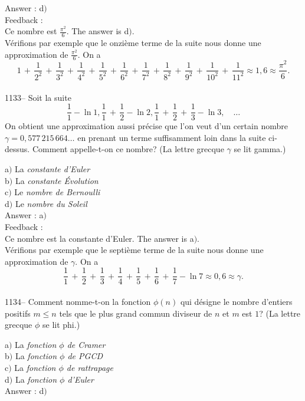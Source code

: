 ﻿\documentclass[letterpaper, 12pt]{article}
\begin{document}
Answer : d$)$\\

Feedback : \\
Ce nombre est $\frac{\pi^2}6$. The answer is d$)$.\\
V\'erifions
par exemple que le onzi\`eme terme de la suite nous donne une
approximation de $\frac{\pi^2}6$. On a
$$\displaystyle{1\,+\,\frac1{2^2}\,+\,\frac1{3^2}\,+\,\frac1{4^2}\,+\,\frac1{5^2}\,+\,\frac1{6^2}\,+\,\frac1{7^2}
\,+\,\frac1{8^2}\,+\,\frac1{9^2}\,+\,\frac1{10^2}\,+\,\frac1{11^2}\approx1,6\approx\frac{\pi^2}6}.$$\\

1133-- Soit la suite
$$\displaystyle{\frac11-\ln1,\frac11\,+\,\frac12-\ln2,\frac11\,+\,\frac12\,+\,\frac13-\ln3},\quad\ldots$$
On obtient une approximation aussi pr\'ecise que l'on veut d'un
certain nombre $\gamma=0,577\,215\,664\ldots$ en prenant un terme
suffisamment loin dans la suite ci-dessus. Comment appelle-t-on ce
nombre? (La lettre grecque $\gamma$ se lit gamma.)

a$)$ La {\sl constante d'Euler}\\
b$)$ La {\sl constante \'Evolution} \\
c$)$ Le {\sl nombre de Bernoulli} \\
d$)$ Le {\sl nombre du Soleil}\\

Answer : a$)$\\

Feedback : \\
Ce nombre est la constante d'Euler. The answer is
a$)$.\\
V\'erifions par exemple que le septi\`eme terme de la suite
nous donne une approximation de $\gamma$. On a
$$\displaystyle{\frac11\,+\,\frac12\,+\,\frac13\,+\,\frac14\,+\,\frac15\,+\,\frac16\,+\,\frac17-\ln7}
\approx0,6\approx\gamma.$$\\

1134-- Comment nomme-t-on la fonction $\phi(n)$ qui d\'esigne le
nombre d'entiers positifs $m\le n$ tels que le plus grand commun
diviseur de $n$ et $m$ est $1$? (La lettre grecque $\phi$ se lit
phi.)

a$)$ La {\sl fonction $\phi$ de Cramer} \\
b$)$ La {\sl fonction $\phi$ de PGCD}   \\
c$)$ La {\sl fonction $\phi$ de rattrapage} \\
d$)$ La {\sl fonction $\phi$ d'Euler}\\

Answer : d$)$\\
\end{document}
